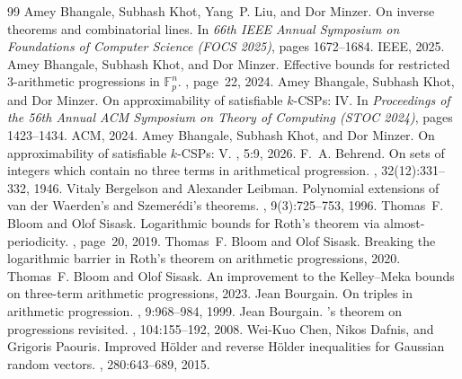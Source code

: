 \documentclass[10pt,a4paper]{amsart}
\begin{document}
\begin{thebibliography}{99}
 Amey Bhangale, Subhash Khot, Yang~P. Liu, and Dor Minzer. \newblock On inverse theorems and combinatorial lines. \newblock In {\em 66th {IEEE} Annual Symposium on Foundations of Computer Science ({FOCS} 2025)}, pages 1672--1684. {IEEE}, 2025.
 Amey Bhangale, Subhash Khot, and Dor Minzer. \newblock Effective bounds for restricted {$3$}-arithmetic progressions in {$\mathbb{F}_p^n$}. , page~22, 2024.
 Amey Bhangale, Subhash Khot, and Dor Minzer. \newblock On approximability of satisfiable {$k$}-{CSPs}: {IV}. \newblock In {\em Proceedings of the 56th Annual {ACM} Symposium on Theory of Computing ({STOC} 2024)}, pages 1423--1434. {ACM}, 2024.
 Amey Bhangale, Subhash Khot, and Dor Minzer. \newblock On approximability of satisfiable {$k$}-{CSPs}: {V}. , 5:9, 2026.
 F.~A. Behrend. \newblock On sets of integers which contain no three terms in arithmetical progression. , 32(12):331--332, 1946.
 Vitaly Bergelson and Alexander Leibman. \newblock Polynomial extensions of van der {Waerden}'s and {Szemer{\'e}di}'s theorems. , 9(3):725--753, 1996.
 Thomas~F. Bloom and Olof Sisask. \newblock Logarithmic bounds for {Roth}'s theorem via almost-periodicity. , page~20, 2019.
 Thomas~F. Bloom and Olof Sisask. \newblock Breaking the logarithmic barrier in {Roth}'s theorem on arithmetic progressions, 2020.
 Thomas~F. Bloom and Olof Sisask. \newblock An improvement to the {Kelley--Meka} bounds on three-term arithmetic progressions, 2023.
 Jean Bourgain. \newblock On triples in arithmetic progression. , 9:968--984, 1999.
 Jean Bourgain. 's theorem on progressions revisited. , 104:155--192, 2008.
 Wei-Kuo Chen, Nikos Dafnis, and Grigoris Paouris. \newblock Improved {H{\"o}lder} and reverse {H{\"o}lder} inequalities for {Gaussian} random vectors. , 280:643--689, 2015.

\end{thebibliography}
\end{document}
